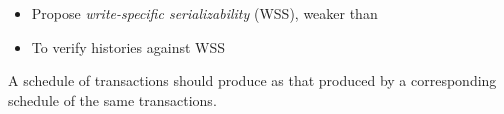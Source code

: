 
\begin{frame}{}
	\begin{center}

		\vspace{0.30cm}
		\begin{itemize}
			\item Propose \emph{write-specific serializability} (WSS), weaker than \ser
			\item To verify histories against WSS
		\end{itemize}
	\end{center}

	\pause
	\begin{definition}
		A schedule of  transactions
		should produce 
		as that produced by a corresponding  schedule
		of the same transactions.
	\end{definition}
\end{frame}

\begin{frame}{}
\end{frame}



